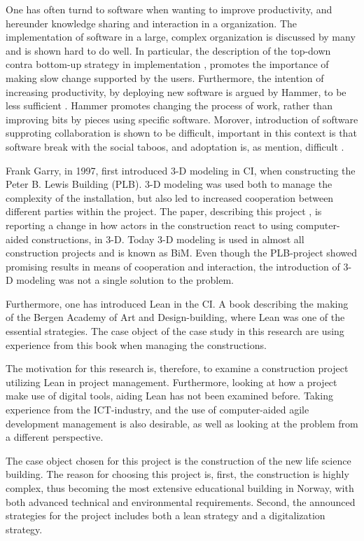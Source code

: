 One has often turnd to software when wanting to improve productivity, and hereunder knowledge sharing and interaction in a organization. The implementation of software in a large, complex organization is discussed by many and is shown hard to do well. In particular, the description of the top-down contra bottom-up strategy in implementation \cite{Robey&Sahay}, promotes the importance of making slow change supported by the users. Furthermore, the intention of increasing productivity, by deploying new software is argued by Hammer, to be less sufficient \cite{hammer1990reengineering}. Hammer promotes changing the process of work, rather than improving bits by pieces using specific software. Morover, introduction of software supproting collaboration is shown to be difficult, important in this context is that software break with the social taboos, and adoptation is, as mention, difficult \cite{Grudin}. 

Frank Garry, in 1997, first introduced 3-D modeling in CI, when constructing the Peter B. Lewis Building (PLB). 3-D modeling was used both to manage the complexity of the installation, but also led to increased cooperation between different parties within the project. The paper, describing this project \cite{frank_gehry}, is reporting a change in how actors in the construction react to using computer-aided constructions, in 3-D. Today 3-D modeling is used in almost all construction projects and is known as BiM. Even though the PLB-project showed promising results in means of cooperation and interaction, the introduction of 3-D modeling was not a single solution to the problem.

Furthermore, one has introduced Lean in the CI. A book \cite{lean_i_praksis} describing the making of the Bergen Academy of Art and Design-building, where Lean was one of the essential strategies. The case object of the case study in this research are using experience from this book when managing the constructions. 

The motivation for this research is, therefore, to examine a construction project utilizing Lean in project management. Furthermore, looking at how a project make use of digital tools, aiding Lean has not been examined before. Taking experience from the ICT-industry, and the use of computer-aided agile development management is also desirable, as well as looking at the problem from a different perspective.

The case object chosen for this project is the construction of the new life science building. The reason for choosing this project is, first, the construction is highly complex, thus becoming the most extensive educational building in Norway, with both advanced technical and environmental requirements. Second, the announced strategies for the project includes both a lean strategy and a digitalization strategy. 

